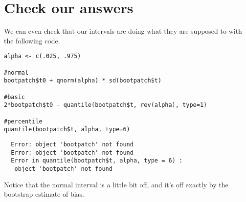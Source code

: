 \documentclass[11pt,english]{article}
\begin{document}
\section*{Check our answers}
\label{sec-3}

We can even check that our intervals are doing what they are supposed to with the following code.


\begin{verbatim}
alpha <- c(.025, .975)

#normal
bootpatch$t0 + qnorm(alpha) * sd(bootpatch$t)

#basic
2*bootpatch$t0 - quantile(bootpatch$t, rev(alpha), type=1)

#percentile
quantile(bootpatch$t, alpha, type=6)
\end{verbatim}




\begin{verbatim}
  Error: object 'bootpatch' not found
  Error: object 'bootpatch' not found
  Error in quantile(bootpatch$t, alpha, type = 6) : 
   object 'bootpatch' not found
\end{verbatim}


Notice that the normal interval is a little bit off, and it's off exactly by the bootstrap estimate of bias.
\end{document}
